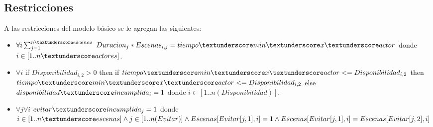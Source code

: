 \documentclass{article}
\begin{document}
\subsection{Restricciones}
A las restricciones del modelo básico se le agregan las siguientes:
\begin{itemize}
    \item $\forall i\sum_{j=1}^{n\textunderscore escenas}$  $Duracion_j * Escenas_{i,j} = tiempo\textunderscore min\textunderscore x\textunderscore actor$\newline
          donde $i \in [1..n\textunderscore actores]$.
    \item $\forall i$  if $Disponibilidad_{i,2} > 0$ then if $tiempo\textunderscore min\textunderscore x\textunderscore actor <= Disponibilidad_{i,2}$ then $tiempo\textunderscore min\textunderscore x\textunderscore actor <= Disponibilidad_{i,2}$ else $disponibilidad\textunderscore incumplida_i = 1$\newline
          donde $i \in [1..n(Disponibilidad)]$.
    \item $\forall j \forall i$ $evitar\textunderscore incumplida_j=1$   \newline donde $i \in [1..n\textunderscore escenas] \land j \in [1..n(Evitar)] \land Escenas[Evitar[j,1],i]=1 \land Escenas[Evitar[j,1],i]=Escenas[Evitar[j,2],i]$

    
\end{itemize}
\end{document}
